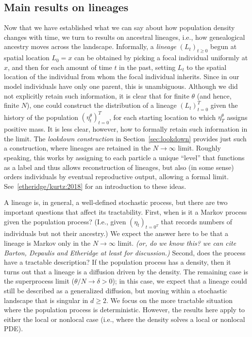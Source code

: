 \documentclass[12pt]{article}
\newcommand{\comment}[1]{{\color{blue} \it #1}}
\begin{document}
\subsection{Main results on lineages}

Now that we have established what we can say about how population density changes with time,
we turn to results on ancestral lineages,
i.e., how genealogical ancestry moves across the landscape.
Informally,
a \emph{lineage} $(L_t)_{t \ge 0}$
begun at spatial location $L_0 = x$
can be obtained by picking a focal individual uniformly at $x$,
and then for each amount of time $t$ in the past,
setting $L_t$ to the spatial location of the individual from whom
the focal individual inherits.
Since in our model individuals have only one parent, this is unambiguous.
Although we did not explicitly retain such information,
it is clear that
for finite $\theta$ (and hence, finite $N$),
one could construct the distribution of a lineage $(L_t)_{t=0}^T$
given the history of the population $(\eta^\theta_t)_{t = 0}^T$,
for each starting location to which $\eta^\theta_T$ assigns positive mass.
It is less clear, however, how to formally retain such information in the limit.
The \emph{lookdown construction} in Section~\ref{sec:lookdown}
provides just such a construction,
where lineages are retained in the $N \to \infty$ limit.
Roughly speaking,
this works by assigning to each particle a unique ``level''
that functions as a label and thus allows reconstruction of lineages,
but also (in some sense) orders individuals by eventual reproductive output,
allowing a formal limit.
See~\ref{etheridge/kurtz:2018} for an introduction to these ideas.

A lineage is, in general, a well-defined stochastic process,
but there are two important questions
that affect its tractability.
First, when is it a Markov process given the population process?
(I.e., given $(\eta_t)_{t=0^T}$ that records numbers of individuals
but not their ancestry.)
We expect the answer here to be that a lineage is Markov
only in the $N \to \infty$ limit.
\comment{(or, do we know this? we can cite Barton, Depaulis and Etheridge at least for discussion.)}
Second, does the process have a tractable description?
If the population process has a density,
then it turns out that a lineage is a diffusion driven by the density.
The remaining case is the superprocess limit ($\theta/N \to \delta > 0$);
in this case, we expect that a lineage could still be described as a generalized diffusion,
but moving within a stochastic landscape that is singular in $d \ge 2$.
We focus on the more tractable situation where the population process is deterministic.
However, the results here apply to either the local or nonlocal case
(i.e., where the density solves a local or nonlocal PDE).
\end{document}
